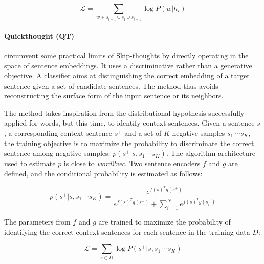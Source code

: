 \begin{equation*}
    \mathcal{L} = \sum_{w \in s_{i-1} \cup s_{i} \cup s_{i+1}} \log P(w | h_i)
\end{equation*}

\paragraph{Quickthought (QT)} \textcite{logeswaran_18} circumvent some practical limits of Skip-thoughts by directly operating in the space of sentence embeddings. It uses a discriminative rather than a generative objective. A classifier aims at distinguishing the correct embedding of a target sentence given a set of candidate sentences. The method thus avoids reconstructing the surface form of the input sentence or its neighbors.

The method takes inspiration from the distributional hypothesis successfully applied for words, but this time, to identify context sentences. Given a sentence $s$, a corresponding context sentence $s^+$ and a set of $K$ negative samples $s^-_1 \cdots s^-_K$, the training objective is to maximize the probability to discriminate the correct sentence among negative samples: $p(s^+ | s, s^-_1 \cdots s^-_K)$. The algorithm architecture used to estimate $p$ is close to \textsl{word2vec}. Two sentence encoders $f$ and $g$ are defined, and the conditional probability is estimated as follows:


\begin{equation*}
    p(s^+ | s, s^-_1 \cdots s^-_K) = \frac{e^{f(s)^Tg(s^+)}}{e^{f(s)^Tg(s^+)}+\sum_{i=1}^Ne^{f(s)^Tg(s^-_i)}}    
\end{equation*}

The parameters from $f$ and $g$ are trained to maximize the probability of identifying the correct context sentences for each sentence in the training data $D$:

\begin{equation*}
    \mathcal{L} = \sum_{s \in D} \log P(s^+ | s, s^-_1 \cdots s^-_K)
\end{equation*}

